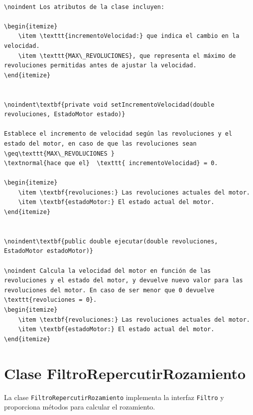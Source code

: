 \documentclass{article}
\begin{document}
\begin{lstlisting}

\noindent Los atributos de la clase incluyen:

\begin{itemize}
    \item \texttt{incrementoVelocidad:} que indica el cambio en la velocidad.
    \item \texttt{MAX\_REVOLUCIONES}, que representa el máximo de revoluciones permitidas antes de ajustar la velocidad. 
\end{itemize}


\noindent\textbf{private void setIncrementoVelocidad(double revoluciones, EstadoMotor estado)}

Establece el incremento de velocidad según las revoluciones y el estado del motor, en caso de que las revoluciones sean \geq\texttt{MAX\_REVOLUCIONES } 
\textnormal{hace que el}  \texttt{ incrementoVelocidad} = 0.

\begin{itemize}
    \item \textbf{revoluciones:} Las revoluciones actuales del motor.
    \item \textbf{estadoMotor:} El estado actual del motor.
\end{itemize}

  
\noindent\textbf{public double ejecutar(double revoluciones, EstadoMotor estadoMotor)} 

\noindent Calcula la velocidad del motor en función de las revoluciones y el estado del motor, y devuelve nuevo valor para las revoluciones del motor. En caso de ser menor que 0 devuelve \texttt{revoluciones = 0}.
\begin{itemize}
    \item \textbf{revoluciones:} Las revoluciones actuales del motor.
    \item \textbf{estadoMotor:} El estado actual del motor.
\end{itemize}

\end{lstlisting}

\section{Clase FiltroRepercutirRozamiento}

La clase \texttt{FiltroRepercutirRozamiento} implementa la interfaz \texttt{Filtro} y proporciona métodos para calcular el rozamiento.
\end{document}
